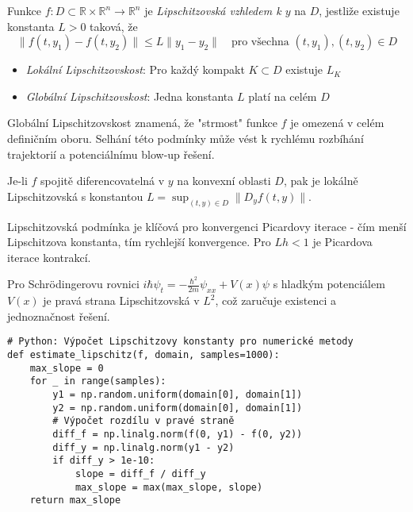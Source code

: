 \begin{definition}
Funkce $f: D \subset \mathbb{R} \times \mathbb{R}^n \to \mathbb{R}^n$ je \emph{Lipschitzovská vzhledem k $y$} na $D$, jestliže existuje konstanta $L > 0$ taková, že
\[
\|f(t,y_1) - f(t,y_2)\| \leq L\|y_1 - y_2\| \quad \text{pro všechna } (t,y_1), (t,y_2) \in D
\]
\end{definition}

\begin{definition}
\begin{itemize}
\item \emph{Lokální Lipschitzovskost}: Pro každý kompakt $K \subset D$ existuje $L_K$
\item \emph{Globální Lipschitzovskost}: Jedna konstanta $L$ platí na celém $D$
\end{itemize}
\end{definition}

\begin{intuition}
Globální Lipschitzovskost znamená, že "strmost" funkce $f$ je omezená v celém definičním oboru. Selhání této podmínky může vést k rychlému rozbíhání trajektorií a potenciálnímu blow-up řešení.
\end{intuition}

\begin{theorem}
Je-li $f$ spojitě diferencovatelná v $y$ na konvexní oblasti $D$, pak je lokálně Lipschitzovská s konstantou $L = \sup_{(t,y)\in D} \|D_y f(t,y)\|$.
\end{theorem}

\begin{keyinsight}
Lipschitzovská podmínka je klíčová pro konvergenci Picardovy iterace - čím menší Lipschitzova konstanta, tím rychlejší konvergence. Pro $Lh < 1$ je Picardova iterace kontrakcí.
\end{keyinsight}

\begin{example}
Pro Schrödingerovu rovnici $i\hbar\psi_t = -\frac{\hbar^2}{2m}\psi_{xx} + V(x)\psi$ s hladkým potenciálem $V(x)$ je pravá strana Lipschitzovská v $L^2$, což zaručuje existenci a jednoznačnost řešení.
\end{example}

\begin{application}
\begin{verbatim}
# Python: Výpočet Lipschitzovy konstanty pro numerické metody
def estimate_lipschitz(f, domain, samples=1000):
    max_slope = 0
    for _ in range(samples):
        y1 = np.random.uniform(domain[0], domain[1])
        y2 = np.random.uniform(domain[0], domain[1])
        # Výpočet rozdílu v pravé straně
        diff_f = np.linalg.norm(f(0, y1) - f(0, y2))
        diff_y = np.linalg.norm(y1 - y2)
        if diff_y > 1e-10:
            slope = diff_f / diff_y
            max_slope = max(max_slope, slope)
    return max_slope
\end{verbatim}
\end{application}

